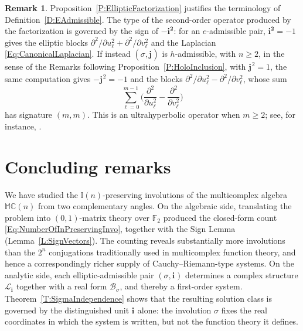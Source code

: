 \documentclass[12pt]{amsart}
\theoremstyle{plain}
\theoremstyle{definition}
\newtheorem*{remark}{Remark}
\numberwithin{equation}{section}
\newcommand{\im}[1]{\mathbf{ i_{#1}}}
\newcommand{\ims}[1]{\mathbf{ i_{#1}^2}}
\newcommand{\jm}[1]{\mathbf{ j_{#1}}}
\newcommand{\mC}{\mathbb{C}}
\newcommand{\mM}{\mathbb{M}}
\newcommand{\mI}{\mathbb{I}}
\newcommand{\cL}{\mathcal{L}}
\newcommand{\cB}{\mathcal{B}}
\begin{document}
    \begin{remark}
    Proposition~\ref{P:EllipticFactorization} justifies the terminology of Definition~\ref{D:EAdmissible}. The type of the second-order operator produced by the factorization is governed by the sign of $- \ims{}$: for an $e$-admissible pair, $\ims{} = -1$ gives the elliptic blocks $\partial^2 / \partial u_\ell^2 + \partial^2 / \partial v_\ell^2$ and the Laplacian \eqref{Eq:CanonicalLaplacian}. If instead $(\sigma , \jm{})$ is $h$-admissible, with $n \geq 2$, in the sense of the Remarks following Proposition~\ref{P:HoloInclusion}, with $\jm{}^2 = 1$, the same computation gives $- \jm{}^2 = -1$ and the blocks $\partial^2 / \partial u_\ell^2 - \partial^2 / \partial v_\ell^2$, whose sum
    \[
    \sum_{\ell = 0}^{m - 1} \Big( \frac{\partial^2}{\partial u_\ell^2} - \frac{\partial^2}{\partial v_\ell^2} \Big)
    \]
    has signature $(m , m)$. This is an ultrahyperbolic operator when $m \geq 2$; see, for instance, \cite{ CraigWeinstein2008, John1938}.
    \end{remark}

\section{Concluding remarks}\label{S:Conclusion}

We have studied the $\mI(n)$-preserving involutions of the multicomplex algebra
$\mM \mC(n)$ from two complementary angles. On the algebraic side, translating the
problem into $(0,1)$-matrix theory over $\mathbb F_2$ produced the closed-form count
\eqref{Eq:NumberOfInPreservingInvo}, together with the Sign Lemma
(Lemma~\ref{L:SignVectors}). The counting reveals substantially more involutions than
the $2^n$ conjugations traditionally used in multicomplex function theory, and hence
a correspondingly richer supply of Cauchy--Riemann-type systems. On the analytic side,
each elliptic-admissible pair $(\sigma,\im{})$ determines a complex structure
$\cL_{\im{}}$ together with a real form $\cB_\sigma$, and thereby a first-order system.
Theorem~\ref{T:SigmaIndependence} shows that the resulting solution class is governed
by the distinguished unit $\im{}$ alone: the involution $\sigma$ fixes the real
coordinates in which the system is written, but not the function theory it defines.



\end{document}
